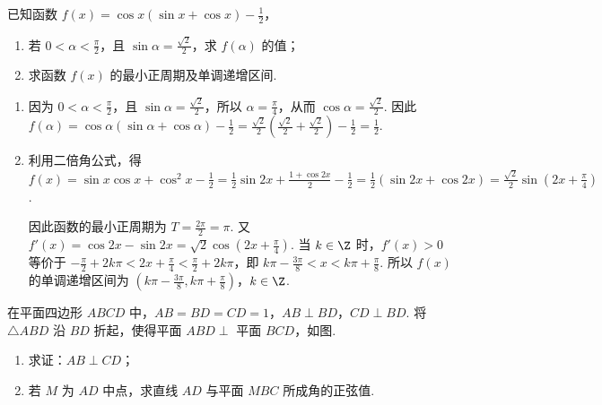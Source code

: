 \begin{problem}
已知函数 \( f(x) = \cos x (\sin x + \cos x) - \frac{1}{2} \)，

\begin{enumerate}
\item 若 \(0 < \alpha < \frac{\pi}{2}\)，且 \(\sin \alpha = \frac{\sqrt{2}}{2}\)，求 \(f(\alpha)\) 的值；
\item 求函数 \(f(x)\) 的最小正周期及单调递增区间.
\end{enumerate}
\end{problem}

\begin{solution}
\begin{enumerate}
\item 因为 \(0<\alpha<\frac{\pi}{2}\)，且 \(\sin\alpha=\frac{\sqrt{2}}{2}\)，所以 \(\alpha=\frac{\pi}{4}\)，从而 \(\cos\alpha=\frac{\sqrt{2}}{2}\). 因此
\(f(\alpha)=\cos\alpha(\sin\alpha+\cos\alpha)-\frac{1}{2}=\frac{\sqrt{2}}{2}\left(\frac{\sqrt{2}}{2}+\frac{\sqrt{2}}{2}\right)-\frac{1}{2}=\frac{1}{2}\).

\item 利用二倍角公式，得
\(f(x)=\sin x\cos x+\cos^2x-\frac{1}{2}=\frac{1}{2}\sin2x+\frac{1+\cos2x}{2}-\frac{1}{2}=\frac{1}{2}(\sin2x+\cos2x)=\frac{\sqrt{2}}{2}\sin\left(2x+\frac{\pi}{4}\right)\).

因此函数的最小正周期为 \(T=\frac{2\pi}{2}=\pi\). 又
\(f'(x)=\cos2x-\sin2x=\sqrt{2}\cos\left(2x+\frac{\pi}{4}\right)\).
当 \(k\in\Z\) 时，\(f'(x)>0\) 等价于
\(-\frac{\pi}{2}+2k\pi<2x+\frac{\pi}{4}<\frac{\pi}{2}+2k\pi\)，即
\(k\pi-\frac{3\pi}{8}<x<k\pi+\frac{\pi}{8}\). 所以 \(f(x)\) 的单调递增区间为 \(\left(k\pi-\frac{3\pi}{8},k\pi+\frac{\pi}{8}\right)\)，\(k\in\Z\).
\end{enumerate}
\end{solution}

\begin{problem}
在平面四边形 \(ABCD\) 中，\(AB = BD = CD = 1\)，\(AB \perp BD\)，\(CD \perp BD\). 将 \(\triangle ABD\) 沿 \(BD\) 折起，使得平面 \(ABD \perp\) 平面 \(BCD\)，如图.

\begin{enumerate}
\item 求证：\(AB \perp CD\)；
\item 若 \(M\) 为 \(AD\) 中点，求直线 \(AD\) 与平面 \(MBC\) 所成角的正弦值.
\end{enumerate}

\end{problem}

